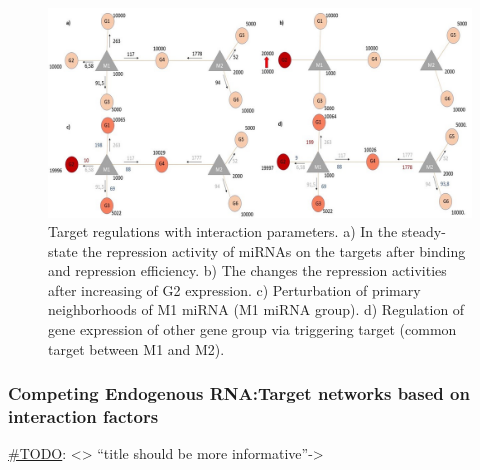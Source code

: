 \documentclass[]{article}
\begin{document}
\begin{figure}
\hypertarget{fig3}{%
\centering
\includegraphics{Fig3.jpg}
\caption{Target regulations with interaction parameters. a) In the
steady-state the repression activity of miRNAs on the targets after
binding and repression efficiency. b) The changes the repression
activities after increasing of G2 expression. c) Perturbation of primary
neighborhoods of M1 miRNA (M1 miRNA group). d) Regulation of gene
expression of other gene group via triggering target (common target
between M1 and M2).}\label{fig3}
}
\end{figure}

\hypertarget{competing-endogenous-rnatarget-networks-based-on-interaction-factors}{%
\subsubsection{Competing Endogenous RNA:Target networks based on
interaction
factors}\label{competing-endogenous-rnatarget-networks-based-on-interaction-factors}}

\href{}{\#TODO}: \textless{}\textgreater{} ``title should be more
informative''-\textgreater{}
\end{document}
